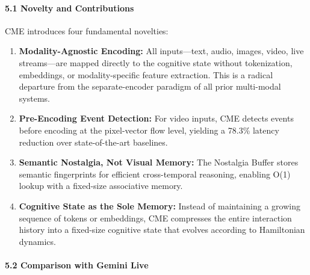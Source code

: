 \documentclass[
  11pt,
  a4paper,
]{article}
\begin{document}
\paragraph{5.1 Novelty and
Contributions}\label{novelty-and-contributions}

CME introduces four fundamental novelties:

\begin{enumerate}
\def\labelenumi{\arabic{enumi}.}
\item
  \textbf{Modality-Agnostic Encoding:} All inputs---text, audio, images,
  video, live streams---are mapped directly to the cognitive state
  without tokenization, embeddings, or modality-specific feature
  extraction. This is a radical departure from the separate-encoder
  paradigm of all prior multi-modal systems.
\item
  \textbf{Pre-Encoding Event Detection:} For video inputs, CME detects
  events before encoding at the pixel-vector flow level, yielding a
  78.3\% latency reduction over state-of-the-art baselines.
\item
  \textbf{Semantic Nostalgia, Not Visual Memory:} The Nostalgia Buffer
  stores semantic fingerprints for efficient cross-temporal reasoning,
  enabling O(1) lookup with a fixed-size associative memory.
\item
  \textbf{Cognitive State as the Sole Memory:} Instead of maintaining a
  growing sequence of tokens or embeddings, CME compresses the entire
  interaction history into a fixed-size cognitive state that evolves
  according to Hamiltonian dynamics.
\end{enumerate}

\paragraph{5.2 Comparison with Gemini
Live}\label{comparison-with-gemini-live}
\end{document}
